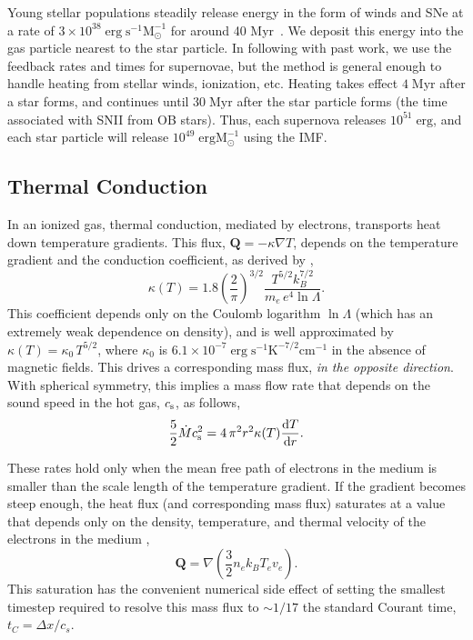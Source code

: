 Young stellar populations steadily release energy in the form of winds and SNe at
a rate of $3\times 10^{38}\;\mathrm{erg\; s^{-1} M_\odot^{-1}}$ for around 40
Myr~\citep{Leitherer1999}. We deposit this energy into the gas particle nearest
to the star particle.  In following with past work, we use the feedback rates
and times for supernovae, but the method is general enough to handle heating
from stellar winds, ionization, etc.  Heating takes effect
$4\;\mathrm{Myr}$ after a star forms, and continues until $30\;\mathrm{Myr}$
after the star particle forms (the time associated with SNII from OB stars).  Thus,
each supernova releases $10^{51}\;\mathrm{erg}$, and each star particle will
release $10^{49}\;\mathrm{erg M^{-1}_\odot}$ using the \citet{Chabrier2003} IMF.

\subsection{Thermal Conduction}
In an ionized gas, thermal conduction, mediated by electrons,
transports heat down temperature gradients.  This flux, $\mathbf{Q} =
-\kappa\nabla T$, depends on the temperature gradient and the conduction
coefficient, as derived by \citet{Cowie1977},
\begin{equation} \label{coefficient1}
    \kappa(T) = 1.8\left(\frac{2}{\pi}\right)^{3/2}\frac{T^{5/2}k_B^{7/2}}{m_e\,e^4\ln\Lambda}.
\end{equation}
This coefficient depends only on the Coulomb logarithm $\ln\Lambda$ (which has
an extremely weak dependence on density), and is well approximated by $\kappa(T)
= \kappa_0\,T^{5/2}$, where $\kappa_0$ is $6.1\times10^{-7}\;\mathrm{erg\;s^{-1}
K^{-7/2}cm^{-1}}$ in the absence of magnetic fields.  This drives a
corresponding mass flux, {\it in the opposite direction}.  With spherical
symmetry, this implies a mass flow rate that depends on the sound speed in the
hot gas, $c_{\rm s}$, as follows,
\begin{equation}\label{conservation1}
    \frac{5}{2}\dot M c_{\rm s}^2 = 4\,\pi^2r^2\kappa(T)\frac{{\rm d}T}{{\rm d}r}.
\end{equation}

These rates hold only when the mean free path of electrons in the medium is
smaller than the scale length of the temperature gradient.  If the gradient
becomes steep enough, the heat flux (and corresponding mass flux) saturates at a
value that depends only on the density, temperature, and thermal velocity of the
electrons in the medium \citep{Cowie1977},
\begin{equation}\label{heatflux1}
    \mathbf{Q} = \nabla\left(\frac{3}{2}n_ek_BT_ev_e\right).
\end{equation}
This saturation has the convenient numerical side effect of setting the smallest
timestep required to resolve this mass flux to $\sim 1/17$ the standard Courant
time, $t_C = \Delta x /c_s$.

